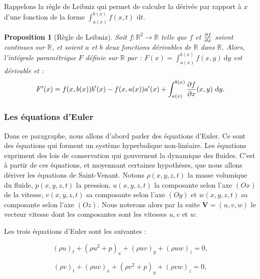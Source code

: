 \documentclass[
11pt, %
francais, %
singlespacing, %
headsepline, %
]{MastersDoctoralThesis} %
\newtheorem{prop}{Proposition}
\theoremstyle{definition}
\begin{document}
Rappelons la règle de Leibniz qui permet de calculer la dérivée par rapport à $x$ d'une fonction de la forme $\int_{a(x)}^{b(x)} f(x,t)\,~\mathrm dt$.

\begin{prop}[Règle de Leibniz]
Soit $f : \mathbb{R}^{2} \rightarrow\mathbb{R}$ telle que $f$ et ${\partial f\over\partial x}$ soient continues sur $\mathbb{R}$, et soient $a$ et $b$ deux fonctions dérivables de $\mathbb{R}$ dans $\mathbb{R}$. Alors, l'intégrale paramétrique $F$ définie sur $\mathbb{R}$ par : $F(x)=\int_{a(x)}^{b(x)}f(x,y)~\mathrm dy$ est dérivable et :
\begin{equation}
F'(x)=f(x, b(x))b'(x)-f(x,a(x))a'(x)+\int_{a(x)}^{b(x)}{\partial f\over \partial x}(x,y)~\mathrm dy.
\end{equation}
\end{prop}

\subsubsection{Les équations d'Euler}

Dans ce paragraphe, nous allons d'abord parler des équations d'Euler. Ce sont des équations qui forment un système hyperbolique non-linéaire. Les équations expriment des lois de conservation qui gouvernent la dynamique des fluides. C'est à partir de ces équations, et moyennant certaines hypothèses, que nous allons dériver les équations de Saint-Venant. Notons $\rho(x,y,z,t)$ la masse volumique du fluide, $p(x,y,z,t)$ la pression, $u(x,y,z,t)$ la composante selon l'axe $(Ox)$ de la vitesse, $v(x,y,z,t)$ sa composante selon l'axe $(Oy)$ et $w(x,y,z,t)$ sa composante selon l'axe $(Oz)$. Nous noterons alors par la suite $\textbf{V}=(u,v,w )$ le vecteur vitesse dont les composantes sont les vitesses $u, v$ et $w$. 

Les trois équations d'Euler sont les suivantes :


\begin{equation} (\rho u)_{t} + (\rho u^{2}+p)_{x}+(\rho uv)_{y}+(\rho uw)_{z} =0, \label{Euler1} \end{equation}

\begin{equation} (\rho v)_{t} + (\rho uv)_{x}+(\rho v^{2}+p)_{y}+(\rho vw)_{z} =0,\label{Euler2}\end{equation}
\end{document}

